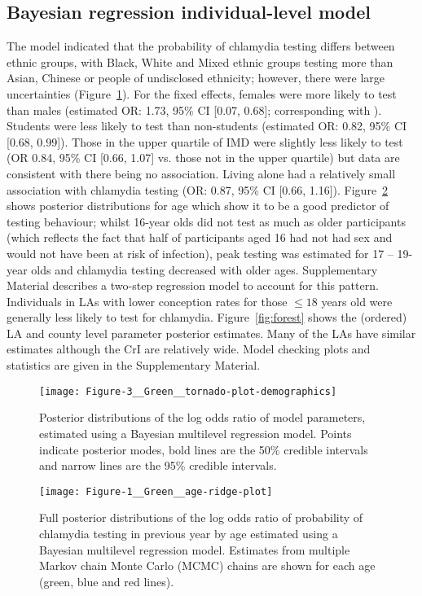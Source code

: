 \documentclass[fleqn,10pt]{wlscirep}
\begin{document}
\subsection*{Bayesian regression individual-level model}
The model indicated that the probability of chlamydia testing differs between ethnic groups, with Black, White and Mixed ethnic groups testing more than Asian, Chinese or people of undisclosed ethnicity; however, there were large uncertainties (Figure~\ref{fig:tornado}). For the fixed effects, females were more likely to test than males (estimated OR: 1.73, 95\% CI [0.07, 0.68]; corresponding with \cite{Sonnenberg2013}). Students were less likely to test than non-students (estimated OR: 0.82, 95\% CI [0.68, 0.99]). Those in the upper quartile of IMD were slightly less likely to test (OR 0.84, 95\% CI [0.66, 1.07] vs. those not in the upper quartile) but data are consistent with there being no association. Living alone had a relatively small association with chlamydia testing (OR: 0.87, 95\% CI [0.66, 1.16]). Figure~\ref{fig:ridge} shows posterior distributions for age which show it to be a good predictor of testing behaviour; whilst 16-year olds did not test as much as older participants (which reflects the fact that half of participants aged 16 had not had sex and would not have been at risk of infection), peak testing was estimated for 17 – 19-year olds and chlamydia testing decreased with older ages. Supplementary Material describes a two-step regression model to account for this pattern. Individuals in LAs with lower conception rates for those $\leq 18$ years old were generally less likely to test for chlamydia. Figure~\ref{fig:forest} shows the (ordered) LA and county level parameter posterior estimates. Many of the LAs have similar estimates although the CrI are relatively wide. Model checking plots and statistics are given in the Supplementary Material.

\begin{figure}[!ht]
\centering
\texttt{[image: Figure-3\_\_Green\_\_tornado-plot-demographics]}
\caption{Posterior distributions of the log odds ratio of model parameters, estimated using a Bayesian multilevel
regression model. Points indicate posterior modes, bold lines are the 50\% credible intervals and narrow lines
are the 95\% credible intervals.}
\label{fig:tornado}
\end{figure}

\begin{figure}[!ht]
\centering
\texttt{[image: Figure-1\_\_Green\_\_age-ridge-plot]}
\caption{Full posterior distributions of the log odds ratio of probability of chlamydia testing in previous year by age estimated using a Bayesian multilevel regression model. Estimates from multiple Markov chain Monte Carlo (MCMC) chains are shown for each age (green, blue and red lines).}
\label{fig:ridge}
\end{figure}
\end{document}
